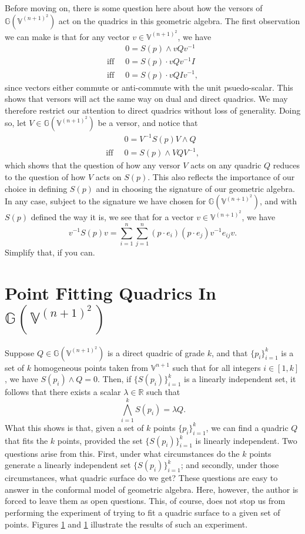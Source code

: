 \documentclass{birkjour}
\theoremstyle{definition}
\theoremstyle{remark}
\numberwithin{equation}{section}
\newcommand{\G}{\mathbb{G}}
\newcommand{\V}{\mathbb{V}}
\newcommand{\R}{\mathbb{R}}
\begin{document}
Before moving on, there is some question here about how the versors
of $\G(\V^{(n+1)^2})$ act on the quadrics in this geometric algebra.
The first observation we can make is that for any vector $v\in\V^{(n+1)^2}$,
we have
\begin{align}
 & 0 = S(p)\wedge vQv^{-1} \\
\mbox{iff}\;\; & 0 = S(p)\cdot vQv^{-1}I \\
\mbox{iff}\;\; & 0 = S(p)\cdot vQIv^{-1},
\end{align}
since vectors either commute or anti-commute with the unit psuedo-scalar.  This shows that
versors will act the same way on dual and direct quadrics.  We may therefore restrict
our attention to direct quadrics without loss of generality.  Doing so, let $V\in\G(\V^{(n+1)^2})$
be a versor, and notice that
\begin{align}
 & 0 = V^{-1}S(p)V\wedge Q \\
\mbox{iff}\;\;& 0 = S(p)\wedge VQV^{-1},
\end{align}
which shows that the question of how any versor $V$ acts on any quadric $Q$ reduces
to the question of how $V$ acts on $S(p)$.  This also reflects the importance of our
choice in defining $S(p)$ and in choosing the signature of our geometric algebra.
In any case, subject to the signature we have chosen for $\G(\V^{(n+1)^2})$,
and with $S(p)$ defined the way it is, we see that for a vector $v\in\V^{(n+1)^2}$,
we have
\begin{equation}
v^{-1}S(p)v = \sum_{i=1}^n\sum_{j=1}^n(p\cdot e_i)(p\cdot e_j)v^{-1}e_{ij}v.
\end{equation}
Simplify that, if you can.

\section{Point Fitting Quadrics In $\G(\V^{(n+1)^2})$}

Suppose $Q\in\G(\V^{(n+1)^2})$ is a direct quadric of grade $k$, and
that $\{p_i\}_{i=1}^k$ is a set of $k$ homogeneous points taken from $\V^{n+1}$
such that for all integers $i\in[1,k]$, we have $S(p_i)\wedge Q=0$.  Then,
if $\{S(p_i)\}_{i=1}^k$ is a linearly independent set, it follows that
there exists a scalar $\lambda\in\R$ such that
\begin{equation}
\bigwedge_{i=1}^k S(p_i) = \lambda Q.
\end{equation}
What this shows is that, given a set of $k$ points $\{p_i\}_{i=1}^k$, we can find a quadric $Q$
that fits the $k$ points, provided the set $\{S(p_i)\}_{i=1}^k$ is linearly
independent.  Two questions
arise from this.  First, under what circumstances do the $k$ points generate
a linearly independent set $\{S(p_i)\}_{i=1}^k$; and secondly, under
those circumstances, what quadric surface do we get?  These questions
are easy to answer in the conformal model of geometric algebra.  Here, however,
the author is forced to leave them as open questions.  This, of course, does
not stop us from performing the experiment of trying to fit a quadric surface
to a given set of points.  Figures \ref{} and \ref{} illustrate the results
of such an experiment.
\end{document}
